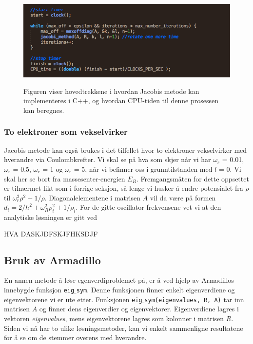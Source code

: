 \documentclass{article}
\begin{document}
\FloatBarrier
\begin{figure}[!ht]
  \begin{center}
  \includegraphics[width = 130mm]{jacobi_method.png}\\
  \caption{Figuren viser hovedtrekkene i hvordan Jacobis metode kan implementeres i C++, og hvordan CPU-tiden til denne prosessen kan beregnes.}\label{fig:jacobi}
  \end{center}
\end{figure}
\FloatBarrier

\subsubsection{To elektroner som vekselvirker}
Jacobis metode kan også brukes i det tilfellet hvor to elektroner vekselvirker med hverandre via Coulombkrefter. Vi skal se på hva som skjer når vi har $\omega_r$ = 0.01, $\omega_r$ = 0.5, $\omega_r$ = 1 og $\omega_r$ = 5, når vi befinner oss i grunntilstanden med $l$ = 0. Vi skal her se bort fra massesenter-energien $E_R$. Fremgangsmåten for dette oppsettet er tilnærmet likt som i forrige seksjon, så lenge vi husker å endre potensialet fra $\rho$ til $\omega_r^2\rho^2 + 1/\rho $. Diagonalelementene i matrisen $A$ vil da være på formen $d_i = 2/h^2 + \omega_R^2\rho_i^2 + 1/\rho_i$. For de gitte oscillator-frekvensene vet vi at den analytiske løsningen er gitt ved 

HVA DASKJDFSKJFHKSDJF


\subsection{Bruk av Armadillo}
En annen metode å løse egenverdiproblemet på, er å ved hjelp av Armadillos innebygde funksjon \texttt{eig$\_$sym}. Denne funksjonen finner enkelt eigenverdiene og eigenvektorene vi er ute etter. Funksjonen \texttt{eig$\_$sym(eigenvalues, R, A)} tar inn matrisen $A$ og finner dens eigenverdier og eigenvektorer. Eigenverdiene lagres i vektoren \textit{eigenvalues}, mens eigenvektorene lagres som kolonner i matrisen $R$. Siden vi nå har to ulike løsningsmetoder, kan vi enkelt sammenligne resultatene for å se om de stemmer overens med hverandre.
\end{document}
